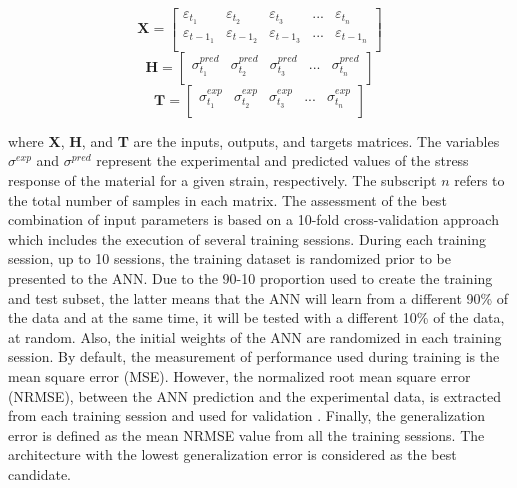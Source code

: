 \begin{equation}
    \mathbf{X} = 
        \begin{bmatrix}
            \varepsilon_{t_1}  & \varepsilon_{t_2}       & \varepsilon_{t_3}      & ... & \varepsilon_{t_n} \\ 
            \varepsilon_{{t-1}_1}& \varepsilon_{{t-1}_2}  & \varepsilon_{{t-1}_3}  & ... & \varepsilon_{{t-1}_n} \\
        \end{bmatrix}
\end{equation}
\begin{equation}
    \mathbf{H} = 
        \begin{bmatrix}
            \sigma^{pred}_{t_1}  & \sigma^{pred}_{t_2}       & \sigma^{pred}_{t_3}      & ... & \sigma^{pred}_{t_n} \\ 
        \end{bmatrix}
\end{equation}
\begin{equation}
    \mathbf{T} = 
        \begin{bmatrix}
            \sigma^{exp}_{t_1}  & \sigma^{exp}_{t_2}       & \sigma^{exp}_{t_3}      & ... & \sigma^{exp}_{t_n} \\ 
        \end{bmatrix}
\end{equation}

\noindent where \textbf{X}, \textbf{H}, and \textbf{T} are the inputs, outputs, and targets matrices. The variables $\sigma^{exp}$ and $\sigma^{pred}$ represent the experimental and predicted values of the stress response of the material for a given strain, respectively. The subscript $n$ refers to the total number of samples in each matrix. The assessment of the best combination of input parameters is based on a 10-fold cross-validation approach which includes the execution of several training sessions. During each training session, up to 10 sessions, the training dataset is randomized prior to be presented to the ANN. Due to the 90-10 proportion used to create the training and test subset, the latter means that the ANN will learn from a different 90\% of the data and at the same time, it will be tested with a different 10\% of the data, at random. Also, the initial weights of the ANN are randomized in each training session. By default, the measurement of performance used during training is the mean square error (MSE). However, the normalized root mean square error (NRMSE), between the ANN prediction and the experimental data, is extracted from each training session and used for validation  \cite{bergstrom2015mechanics}. Finally, the generalization error is defined as the mean NRMSE value from all the training sessions. The architecture with the lowest generalization error is considered as the best candidate.

